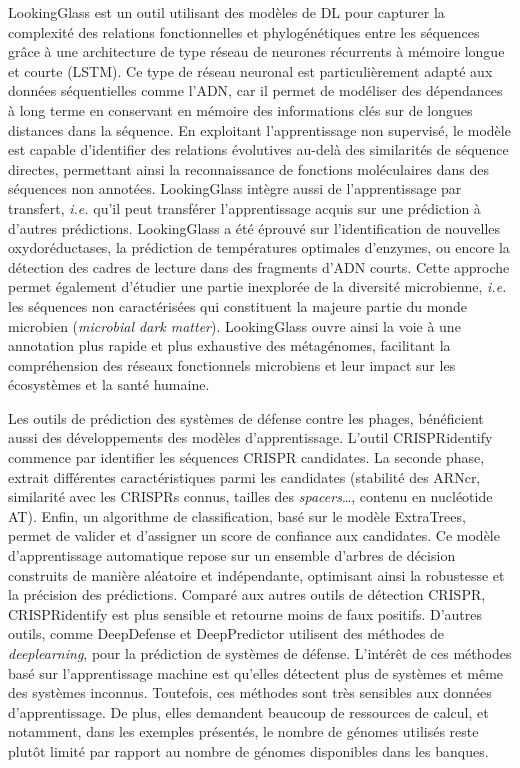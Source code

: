 LookingGlass \cite{hoarfrost_deep_2022} est un outil utilisant des modèles de DL pour capturer la complexité des relations fonctionnelles et phylogénétiques entre les séquences grâce à une architecture de type réseau de neurones récurrents à mémoire longue et courte (LSTM). Ce type de réseau neuronal est particulièrement adapté aux données séquentielles comme l’ADN, car il permet de modéliser des dépendances à long terme en conservant en mémoire des informations clés sur de longues distances dans la séquence. En exploitant l’apprentissage non supervisé, le modèle est capable d’identifier des relations évolutives au-delà des similarités de séquence directes, permettant ainsi la reconnaissance de fonctions moléculaires dans des séquences non annotées. LookingGlass intègre aussi de l'apprentissage par transfert, \textit{i.e.} qu'il peut transférer l'apprentissage acquis sur une prédiction à d'autres prédictions. LookingGlass a été éprouvé sur l'identification de nouvelles oxydoréductases, la prédiction de températures optimales d’enzymes, ou encore la détection des cadres de lecture dans des fragments d’ADN courts. Cette approche permet également d'étudier une partie inexplorée de la diversité microbienne, \textit{i.e.} les séquences non caractérisées qui constituent la majeure partie du monde microbien (\textit{microbial dark matter}). LookingGlass ouvre ainsi la voie à une annotation plus rapide et plus exhaustive des métagénomes, facilitant la compréhension des réseaux fonctionnels microbiens et leur impact sur les écosystèmes et la santé humaine.

Les outils de prédiction des systèmes de défense contre les phages, bénéficient aussi des développements des modèles d'apprentissage. L'outil CRISPRidentify\cite{mitrofanov_crispridentify_2021} commence par identifier les séquences CRISPR candidates. La seconde phase, extrait différentes caractéristiques parmi les candidates (stabilité des ARNcr, similarité avec les CRISPRs connus, tailles des \textit{spacers}\dots, contenu en nucléotide AT). Enfin, un algorithme de classification, basé sur le modèle ExtraTrees, permet de valider et d'assigner un score de confiance aux candidates. Ce modèle d'apprentissage automatique repose sur un ensemble d'arbres de décision construits de manière aléatoire et indépendante, optimisant ainsi la robustesse et la précision des prédictions. Comparé aux autres outils de détection CRISPR, CRISPRidentify est plus sensible et retourne moins de faux positifs. D'autres outils, comme DeepDefense \cite{hauns_deepdefense_2024} et DeepPredictor\cite{hauns_deepdefense_2024} utilisent des méthodes de \textit{deeplearning}, pour la prédiction de systèmes de défense. L'intérêt de ces méthodes basé sur l'apprentissage machine est qu'elles détectent plus de systèmes et même des systèmes inconnus. Toutefois, ces méthodes sont très sensibles aux données d'apprentissage. De plus, elles demandent beaucoup de ressources de calcul, et notamment, dans les exemples présentés, le nombre de génomes utilisés reste plutôt limité par rapport au nombre de génomes disponibles dans les banques.